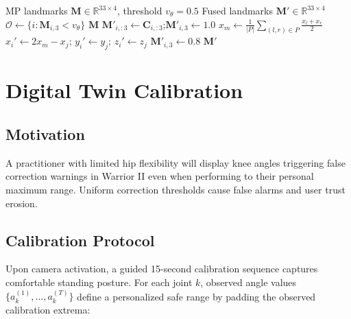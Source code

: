 \documentclass[conference]{IEEEtran}
\begin{document}
\begin{algorithm}[ht]
\caption{Two-Stream Occlusion Recovery}
\label{alg:occlusion}
\begin{algorithmic}[1]
\Require MP landmarks $\mathbf{M} \in \mathbb{R}^{33\times4}$, threshold $v_\theta=0.5$
\Ensure Fused landmarks $\mathbf{M}' \in \mathbb{R}^{33\times4}$
\State $\mathcal{O} \leftarrow \{i : \mathbf{M}_{i,3} < v_\theta\}$
 \Return $\mathbf{M}$ \EndIf
{}
    \State $\mathbf{M}'_{i,:3} \leftarrow \mathbf{C}_{i,:3}$;\quad $\mathbf{M}'_{i,3} \leftarrow 1.0$
  \EndFor
\Else
  \State $x_m \leftarrow \frac{1}{|P|}\sum_{(l,r)\in P}\frac{x_l+x_r}{2}$
      \State $x_i' \leftarrow 2x_m - x_j$;\; $y_i' \leftarrow y_j$;\; $z_i' \leftarrow z_j$
      \State $\mathbf{M}'_{i,3} \leftarrow 0.8$
    \EndIf
  \EndFor
\EndIf
\State \Return $\mathbf{M}'$
\end{algorithmic}
\end{algorithm}

\section{Digital Twin Calibration}
\label{sec:twin}

\subsection{Motivation}

A practitioner with limited hip flexibility will display knee angles triggering false
correction warnings in Warrior II even when performing to their personal maximum range.
Uniform correction thresholds cause false alarms and user trust erosion.

\subsection{Calibration Protocol}

Upon camera activation, a guided 15-second calibration sequence captures comfortable
standing posture. For each joint $k$, observed angle values $\{a_k^{(1)},\ldots,a_k^{(T)}\}$
define a personalized safe range by padding the observed calibration extrema:
\end{document}
